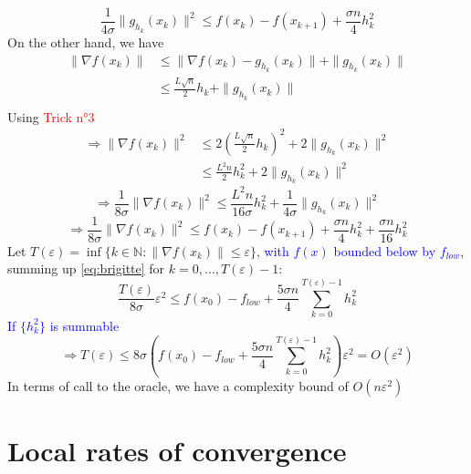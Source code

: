 \documentclass[12pt, openany]{report}
\theoremstyle{definition}
\begin{document}
\begin{equation}
	\frac{1}{4\sigma} \|g_{h_k}(x_k)\|^2 \leq f(x_k) - f(x_{k+1}) + \frac{\sigma n}{4} h_k^2
\end{equation}
On the other hand, we have
\begin{equation}
	\begin{aligned}
		\|\nabla f(x_k)\| &\leq \|\nabla f(x_k) - g_{h_k}(x_k)\| + \|g_{h_k}(x_k)\|\\
		&\leq \frac{L \sqrt{n}}{2} h_k + \|g_{h_k}(x_k)\|\\
	\end{aligned}
\end{equation}
Using \textcolor{red}{Trick n°3}
\begin{equation}
	\begin{aligned}
		\Longrightarrow \|\nabla f(x_k)\|^2 &\leq 2 \left( \frac{L \sqrt{n}}{2} h_k \right)^2 + 2 \|g_{h_k}(x_k)\|^2\\
		&\leq \frac{L^2 n}{2} h_k^2 + 2 \|g_{h_k}(x_k)\|^2 
	\end{aligned}
\end{equation}
\begin{equation}
	\Longrightarrow \frac{1}{8 \sigma} \|\nabla f(x_k)\|^2 \leq \frac{L^2n}{16\sigma} h_k^2 + \frac{1}{4\sigma} \|g_{h_k}(x_k)\|^2
\end{equation}
\begin{equation}\label{eq:brigitte}
	\Longrightarrow \frac{1}{8 \sigma} \|\nabla f(x_k)\|^2 \leq f(x_k) - f(x_{k+1}) + \frac{\sigma n}{4} h_k^2 + \frac{\sigma n}{16}h_k^2
\end{equation}
Let $T(\varepsilon) = \inf \{k\in \mathbb{N}: \|\nabla f(x_k)\| \leq \varepsilon \}$, \textcolor{blue}{with $f(x)$ bounded below by $f_{low}$}, summing up \eqref{eq:brigitte} for $k=0,\dots, T(\varepsilon)-1$:
\begin{equation}
	\frac{T(\varepsilon)}{8 \sigma} \varepsilon^2 \leq f(x_0) - f_{low} + \frac{5 \sigma n}{4} \sum_{k=0}^{T(\varepsilon)-1} h_k^2
\end{equation}
\textcolor{blue}{If $\{h_k^2\}$ is summable}
\begin{equation}
	\Longrightarrow T(\varepsilon) \leq 8 \sigma ( f(x_0) - f_{low} + \frac{5 \sigma n}{4} \sum_{k=0}^{T(\varepsilon)-1} h_k^2) \varepsilon^2 = O(\varepsilon^2)
\end{equation}
In terms of call to the oracle, we have a complexity bound of $O(n\varepsilon^2)$

\chapter{Local rates of convergence}
\end{document}
